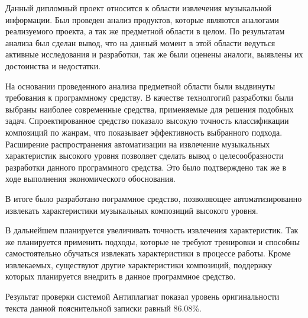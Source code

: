 
Данный дипломный проект относится к области извлечения музыкальной информации. Был проведен анализ продуктов, которые являются аналогами реализуемого проекта, а так же предметной области в целом. По результатам анализа был сделан вывод, что на данный момент в этой области ведуться активные исследования и разработки, так же были оценены аналоги, выявлены их достоинства и недостатки.

На основании проведенного анализа предметной области были выдвинуты требования к программному средству. В качестве технолгогий разработки были выбраны наиболее современные средства, применяемые для решения подобных задач. Спроектированное средство показало высокую точность классификации композиций по жанрам, что показывает эффективность выбранного подхода. Расширение распространения автоматизации на извлечение музыкальных характеристик высокого уровня позволяет сделать вывод о целесообразности разработки данного программного средства. Это было подтверждено так же в ходе выполнения экономического обоснования.

В итоге было разработано пограммное средство, позволяющее автоматизированно извлекать характеристики музыкальных композиций высокого уровня.

В дальнейшем планируется увеличивать точность извлечения характеристик. Так же планируется применить подходы, которые не требуют тренировки и способны самостоятельно обучаться извлекать характеристики в процессе работы. Кроме извлекаемых, существуют другие характеристики композиций, поддержку которых планируется внедрить в данное программное средство.

Результат проверки системой Антиплагиат показал уровень оригинальности текста данной пояснительной записки равный 86.08\%.
